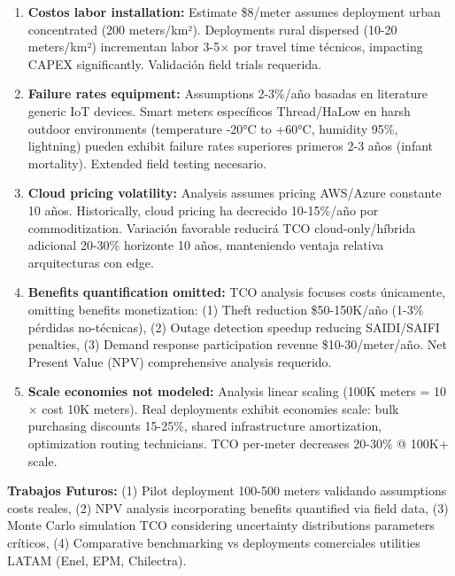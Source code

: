 \begin{enumerate}
\item \textbf{Costos labor installation:} Estimate \$8/meter assumes deployment urban concentrated (200 meters/km²). Deployments rural dispersed (10-20 meters/km²) incrementan labor 3-5$\times$ por travel time técnicos, impacting CAPEX significantly. Validación field trials requerida.

\item \textbf{Failure rates equipment:} Assumptions 2-3\%/año basadas en literature generic IoT devices. Smart meters específicos Thread/HaLow en harsh outdoor environments (temperature -20°C to +60°C, humidity 95\%, lightning) pueden exhibit failure rates superiores primeros 2-3 años (infant mortality). Extended field testing necesario.

\item \textbf{Cloud pricing volatility:} Analysis assumes pricing AWS/Azure constante 10 años. Historically, cloud pricing ha decrecido 10-15\%/año por commoditization. Variación favorable reducirá TCO cloud-only/híbrida adicional 20-30\% horizonte 10 años, manteniendo ventaja relativa arquitecturas con edge.

\item \textbf{Benefits quantification omitted:} TCO analysis focuses costs únicamente, omitting benefits monetization: (1) Theft reduction \$50-150K/año (1-3\% pérdidas no-técnicas), (2) Outage detection speedup reducing SAIDI/SAIFI penalties, (3) Demand response participation revenue \$10-30/meter/año. Net Present Value (NPV) comprehensive analysis requerido.

\item \textbf{Scale economies not modeled:} Analysis linear scaling (100K meters = 10$\times$ cost 10K meters). Real deployments exhibit economies scale: bulk purchasing discounts 15-25\%, shared infrastructure amortization, optimization routing technicians. TCO per-meter decreases 20-30\% @ 100K+ scale.
\end{enumerate}

\textbf{Trabajos Futuros:} (1) Pilot deployment 100-500 meters validando assumptions costs reales, (2) NPV analysis incorporating benefits quantified via field data, (3) Monte Carlo simulation TCO considering uncertainty distributions parameters críticos, (4) Comparative benchmarking vs deployments comerciales utilities LATAM (Enel, EPM, Chilectra).

